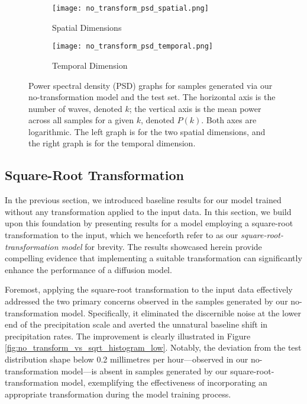 \documentclass[ oneside,%
                    author={George Herbert},
                    degree={MSci},
                     title={Diffusion Models for Time-Evolving Precipitation Fields},
                  subtitle={}]{dissertation}
\begin{document}
\begin{figure}[htbp]
      \centering
      \begin{subfigure}{0.49\textwidth}
            \texttt{[image: no\_transform\_psd\_spatial.png]}
            \caption{Spatial Dimensions}
      \end{subfigure}
      \begin{subfigure}{0.49\textwidth}
            \texttt{[image: no\_transform\_psd\_temporal.png]}
            \caption{Temporal Dimension}
      \end{subfigure}
      \caption{Power spectral density (PSD) graphs for samples generated via our no-transformation model and the test set. The horizontal axis is the number of waves, denoted $k$; the vertical axis is the mean power across all samples for a given $k$, denoted $P(k)$. Both axes are logarithmic. The left graph is for the two spatial dimensions, and the right graph is for the temporal dimension.}
      \label{fig:no_transform_psd}
\end{figure}

\subsection{Square-Root Transformation}
\label{sec:results_square_root}

In the previous section, we introduced baseline results for our model trained without any transformation applied to the input data. In this section, we build upon this foundation by presenting results for a model employing a square-root transformation to the input, which we henceforth refer to as our \textit{square-root-transformation model} for brevity. The results showcased herein provide compelling evidence that implementing a suitable transformation can significantly enhance the performance of a diffusion model.

Foremost, applying the square-root transformation to the input data effectively addressed the two primary concerns observed in the samples generated by our no-transformation model. Specifically, it eliminated the discernible noise at the lower end of the precipitation scale and averted the unnatural baseline shift in precipitation rates. The improvement is clearly illustrated in Figure \ref{fig:no_transform_vs_sqrt_histogram_low}. Notably, the deviation from the test distribution shape below 0.2 millimetres per hour---observed in our no-transformation model---is absent in samples generated by our square-root-transformation model, exemplifying the effectiveness of incorporating an appropriate transformation during the model training process.
\end{document}
